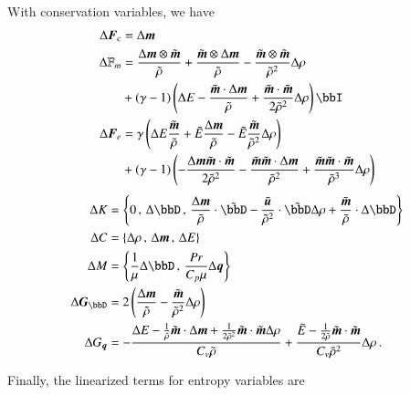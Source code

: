 \documentclass[preprint,12pt]{elsarticle}
\begin{document}
With conservation variables, we have
\begin{align*}
\Delta\bfF_c&=\Delta\bfm\\
\Delta\mathbb{F}_m&=
\frac{\Delta\bfm\otimes\tilde\bfm}{\tilde\rho}
+\frac{\tilde\bfm\otimes\Delta\bfm}{\tilde\rho}
-\frac{\tilde\bfm\otimes\tilde\bfm}{\tilde\rho^2}\Delta\rho\\
&+(\gamma-1)\LRp{\Delta E
-\frac{\tilde\bfm\cdot\Delta\bfm}{\tilde\rho}
+\frac{\tilde\bfm\cdot\tilde\bfm}{2\tilde\rho^2}\Delta\rho
}\bbI\\
\Delta\bfF_e&=
\gamma\LRp{
\Delta E\frac{\tilde\bfm}{\tilde\rho}
+\tilde E\frac{\Delta\bfm}{\tilde\rho}
-\tilde E\frac{\tilde\bfm}{\tilde\rho^2}\Delta\rho}\\
&+(\gamma-1)\LRp{
-\frac{\Delta\bfm\tilde\bfm\cdot\tilde\bfm}{2\tilde\rho^2}
-\frac{\tilde\bfm\tilde\bfm\cdot\Delta\bfm}{\tilde\rho^2}
+\frac{\tilde\bfm\tilde\bfm\cdot\tilde\bfm}{\tilde\rho^3}\Delta\rho
}\\
\end{align*}
\begin{align*}
\Delta K&=\LRc{0\,,\,
\Delta\bbD\,,\,
\frac{\Delta\bfm}{\tilde\rho}\cdot\tilde\bbD
-\frac{\tilde\bfu}{\tilde\rho^2}\cdot\tilde\bbD\Delta\rho
+\frac{\tilde\bfm}{\tilde\rho}\cdot\Delta\bbD}\\
\Delta C&=\LRc{\Delta\rho\,,\,\Delta\bfm\,,\,\Delta E}\\
\Delta M&=\LRc{\frac{1}{\mu}\Delta \bbD\,,\,\frac{Pr}{C_p\mu}\Delta\bfq}\\
\Delta\bfG_{\bbD}&=2\LRp{\frac{\Delta\bfm}{\tilde\rho}-\frac{\tilde\bfm}{\tilde\rho^2}\Delta\rho}\\
\Delta G_{\bfq}&=-\frac{\Delta E-\frac{1}{\tilde\rho}\tilde\bfm\cdot\Delta\bfm
	+\frac{1}{2\tilde\rho^2}\tilde\bfm\cdot\tilde\bfm\Delta\rho}{C_v\tilde\rho}
	+\frac{\tilde E-\frac{1}{2\tilde\rho}\tilde\bfm\cdot\tilde\bfm}{C_v\tilde\rho^2}\Delta\rho\,.
\end{align*}

Finally, the linearized terms for entropy variables are

\end{document}
